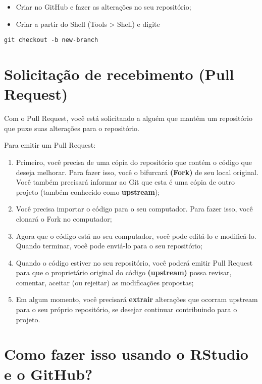 \documentclass[]{book}
\providecommand{\tightlist}{%
  \setlength{\itemsep}{0pt}\setlength{\parskip}{0pt}}
\begin{document}
\begin{itemize}
\tightlist
\item
  Criar no GitHub e fazer as alterações no seu repositório;
\item
  Criar a partir do Shell (Tools \textgreater{} Shell) e digite
\end{itemize}

\texttt{git\ checkout\ -b\ new-branch}

\hypertarget{solicitacao-de-recebimento-pull-request}{%
\section{Solicitação de recebimento (Pull Request)}\label{solicitacao-de-recebimento-pull-request}}

Com o Pull Request, você está solicitando a alguém que mantém um repositório que puxe suas alterações para o repositório.

Para emitir um Pull Request:

\begin{enumerate}
\def\labelenumi{\arabic{enumi}.}
\tightlist
\item
  Primeiro, você precisa de uma cópia do repositório que contém o código que deseja melhorar. Para fazer isso, você o bifurcará \textbf{(Fork)} de seu local original. Você também precisará informar ao Git que esta é uma cópia de outro projeto (também conhecido como \textbf{upstream});
\item
  Você precisa importar o código para o seu computador. Para fazer isso, você clonará o Fork no computador;
\item
  Agora que o código está no seu computador, você pode editá-lo e modificá-lo. Quando terminar, você pode enviá-lo para o seu repositório;
\item
  Quando o código estiver no seu repositório, você poderá emitir Pull Request para que o proprietário original do código \textbf{(upstream)} possa revisar, comentar, aceitar (ou rejeitar) as modificações propostas;
\item
  Em algum momento, você precisará \textbf{extrair} alterações que ocorram upstream para o seu próprio repositório, se desejar continuar contribuindo para o projeto.
\end{enumerate}

\hypertarget{como-fazer-isso-usando-o-rstudio-e-o-github}{%
\section{Como fazer isso usando o RStudio e o GitHub?}\label{como-fazer-isso-usando-o-rstudio-e-o-github}}
\end{document}
